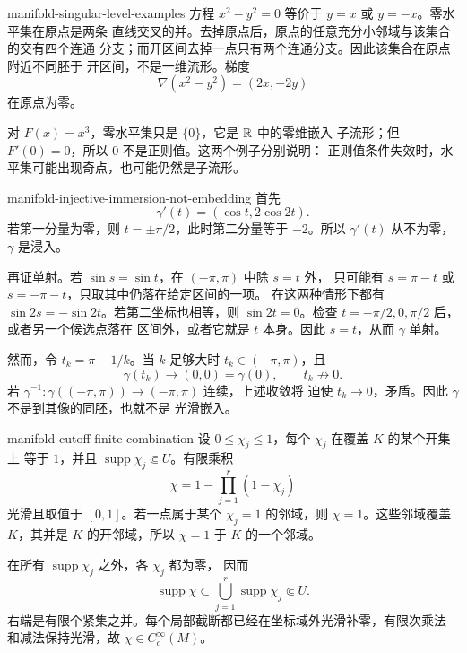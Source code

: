 \begin{solution}{manifold-singular-level-examples}
方程 \(x^2-y^2=0\) 等价于 \(y=x\) 或 \(y=-x\)。零水平集在原点是两条
直线交叉的并。去掉原点后，原点的任意充分小邻域与该集合的交有四个连通
分支；而开区间去掉一点只有两个连通分支。因此该集合在原点附近不同胚于
开区间，不是一维流形。梯度
\[
 \nabla(x^2-y^2)=(2x,-2y)
\]
在原点为零。

对 \(F(x)=x^3\)，零水平集只是 \(\{0\}\)，它是 \(\mathbb{R}\) 中的零维嵌入
子流形；但 \(F'(0)=0\)，所以 \(0\) 不是正则值。这两个例子分别说明：
正则值条件失效时，水平集可能出现奇点，也可能仍然是子流形。
\end{solution}

\begin{solution}{manifold-injective-immersion-not-embedding}
首先
\[
 \gamma'(t)=(\cos t,2\cos 2t).
\]
若第一分量为零，则 \(t=\pm\pi/2\)，此时第二分量等于 \(-2\)。所以
\(\gamma'(t)\) 从不为零，\(\gamma\) 是浸入。

再证单射。若 \(\sin s=\sin t\)，在 \((-\pi,\pi)\) 中除 \(s=t\) 外，
只可能有 \(s=\pi-t\) 或 \(s=-\pi-t\)，只取其中仍落在给定区间的一项。
在这两种情形下都有 \(\sin 2s=-\sin 2t\)。若第二坐标也相等，则
\(\sin 2t=0\)。检查 \(t=-\pi/2,0,\pi/2\) 后，或者另一个候选点落在
区间外，或者它就是 \(t\) 本身。因此 \(s=t\)，从而 \(\gamma\) 单射。

然而，令 \(t_k=\pi-1/k\)。当 \(k\) 足够大时 \(t_k\in(-\pi,\pi)\)，且
\[
 \gamma(t_k)\longrightarrow(0,0)=\gamma(0),
 \qquad t_k\not\longrightarrow0.
\]
若 \(\gamma^{-1}:\gamma((-\pi,\pi))\to(-\pi,\pi)\) 连续，上述收敛将
迫使 \(t_k\to0\)，矛盾。因此 \(\gamma\) 不是到其像的同胚，也就不是
光滑嵌入。
\end{solution}

\begin{solution}{manifold-cutoff-finite-combination}
设 \(0\le\chi_j\le1\)，每个 \(\chi_j\) 在覆盖 \(K\) 的某个开集上
等于 \(1\)，并且 \(\operatorname{supp}\chi_j\Subset U\)。有限乘积
\[
 \chi=1-\prod_{j=1}^r(1-\chi_j)
\]
光滑且取值于 \([0,1]\)。若一点属于某个 \(\chi_j=1\) 的邻域，则
\(\chi=1\)。这些邻域覆盖 \(K\)，其并是 \(K\) 的开邻域，所以
\(\chi=1\) 于 \(K\) 的一个邻域。

在所有 \(\operatorname{supp}\chi_j\) 之外，各 \(\chi_j\) 都为零，
因而
\[
 \operatorname{supp}\chi
 \subset\bigcup_{j=1}^r\operatorname{supp}\chi_j\Subset U.
\]
右端是有限个紧集之并。每个局部截断都已经在坐标域外光滑补零，有限次乘法
和减法保持光滑，故 \(\chi\in C_c^\infty(M)\)。
\end{solution}

